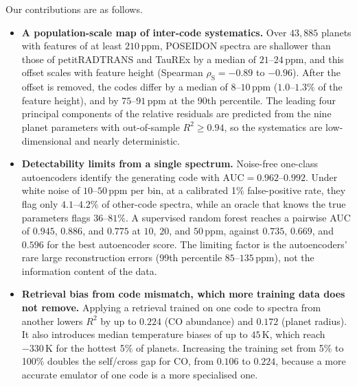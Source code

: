 Our contributions are as follows.
\begin{itemize}
  \item \textbf{A population-scale map of inter-code systematics.}
  Over $43{,}885$ planets with features of at least $210\,\mathrm{ppm}$, POSEIDON spectra are shallower than those of petitRADTRANS and TauREx by a median of $21$--$24\,\mathrm{ppm}$, and this offset scales with feature height (Spearman $\rho_{\mathrm{S}}=-0.89$ to $-0.96$).
  After the offset is removed, the codes differ by a median of $8$--$10\,\mathrm{ppm}$ ($1.0$--$1.3\%$ of the feature height), and by $75$--$91\,\mathrm{ppm}$ at the 90th percentile.
  The leading four principal components of the relative residuals are predicted from the nine planet parameters with out-of-sample $R^2\geq0.94$, so the systematics are low-dimensional and nearly deterministic.

  \item \textbf{Detectability limits from a single spectrum.}
  Noise-free one-class autoencoders identify the generating code with $\mathrm{AUC}=0.962$--$0.992$.
  Under white noise of $10$--$50\,\mathrm{ppm}$ per bin, at a calibrated 1\% false-positive rate, they flag only $4.1$--$4.2\%$ of other-code spectra, while an oracle that knows the true parameters flags $36$--$81\%$.
  A supervised random forest reaches a pairwise AUC of $0.945$, $0.886$, and $0.775$ at $10$, $20$, and $50\,\mathrm{ppm}$, against $0.735$, $0.669$, and $0.596$ for the best autoencoder score.
  The limiting factor is the autoencoders' rare large reconstruction errors (99th percentile $85$--$135\,\mathrm{ppm}$), not the information content of the data.

  \item \textbf{Retrieval bias from code mismatch, which more training data does not remove.}
  Applying a retrieval trained on one code to spectra from another lowers $R^2$ by up to $0.224$ (CO abundance) and $0.172$ (planet radius).
  It also introduces median temperature biases of up to $45\,\mathrm{K}$, which reach $-330\,\mathrm{K}$ for the hottest 5\% of planets.
  Increasing the training set from 5\% to 100\% doubles the self/cross gap for CO, from $0.106$ to $0.224$, because a more accurate emulator of one code is a more specialised one.


\end{itemize}
